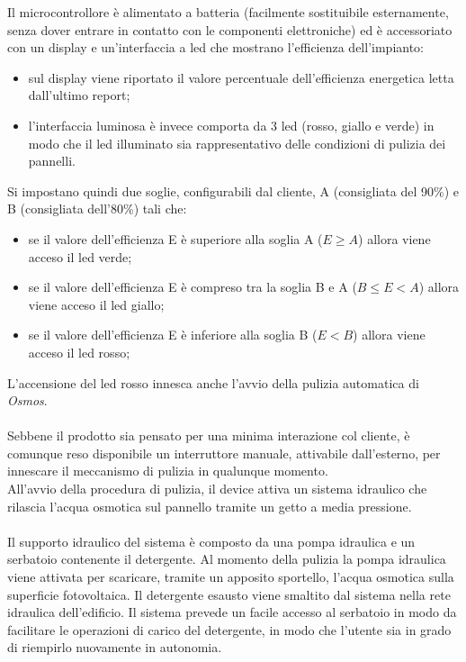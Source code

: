 \documentclass[a4paper, 12pt]{article}
\begin{document}
	Il microcontrollore è alimentato a batteria (facilmente sostituibile esternamente, senza dover entrare in contatto con le componenti elettroniche) ed è accessoriato con un display e un'interfaccia a led che mostrano l'efficienza dell'impianto:
	\begin{itemize}
		\item sul display viene riportato il valore percentuale dell'efficienza energetica letta dall'ultimo report;
		\item l'interfaccia luminosa è invece comporta da 3 led (rosso, giallo e verde) in modo che il led illuminato sia rappresentativo delle condizioni di pulizia dei pannelli.
	\end{itemize}
	Si impostano quindi due soglie, configurabili dal cliente, A (consigliata del 90\%) e B (consigliata dell'80\%) tali che:
	\begin{itemize}
		\item se il valore dell'efficienza E è superiore alla soglia A ($E \ge A$) allora viene acceso il led verde;
		\item se il valore dell'efficienza E è compreso tra la soglia B e A ($B \le E < A$) allora viene acceso il led giallo;
		\item se il valore dell'efficienza E è inferiore alla soglia B ($E < B$) allora viene acceso il led rosso;
	\end{itemize}
	L'accensione del led rosso innesca anche l'avvio della pulizia automatica di \emph{Osmos}.\\\\
	Sebbene il prodotto sia pensato per una minima interazione col cliente, è comunque reso disponibile un interruttore manuale, attivabile dall'esterno, per innescare il meccanismo di pulizia in qualunque momento.\\
	All'avvio della procedura di pulizia, il device attiva un sistema idraulico che rilascia l'acqua osmotica sul pannello tramite un getto a media pressione.\\\\
	Il supporto idraulico del sistema è composto da una pompa idraulica e un serbatoio contenente il detergente. Al momento della pulizia la pompa idraulica viene attivata per scaricare, tramite un apposito sportello, l'acqua osmotica sulla superficie fotovoltaica. Il detergente esausto viene smaltito dal sistema nella rete idraulica dell'edificio.
	Il sistema prevede un facile accesso al serbatoio in modo da facilitare le operazioni di carico del detergente, in modo che l'utente sia in grado di riempirlo nuovamente in autonomia.
\end{document}
